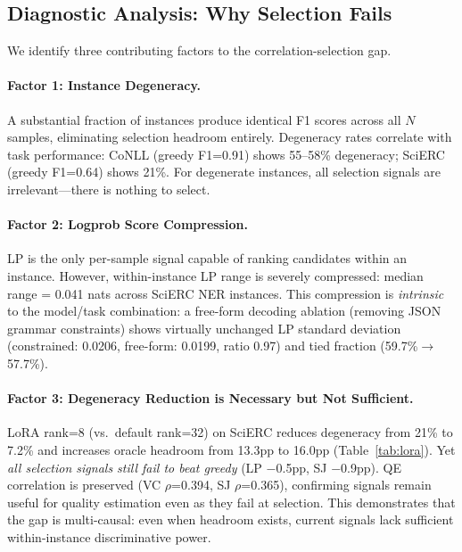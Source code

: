 \documentclass[11pt,a4paper]{article}
\begin{document}
\subsection{Diagnostic Analysis: Why Selection Fails}
\label{sec:diagnostic}

We identify three contributing factors to the correlation-selection gap.

\paragraph{Factor 1: Instance Degeneracy.}
A substantial fraction of instances produce identical F1 scores across all $N$ samples, eliminating selection headroom entirely.
Degeneracy rates correlate with task performance: CoNLL (greedy F1=0.91) shows 55--58\% degeneracy; SciERC (greedy F1=0.64) shows 21\%.
For degenerate instances, all selection signals are irrelevant---there is nothing to select.

\paragraph{Factor 2: Logprob Score Compression.}
LP is the only per-sample signal capable of ranking candidates within an instance.
However, within-instance LP range is severely compressed: median range = 0.041 nats across SciERC NER instances.
This compression is \emph{intrinsic} to the model/task combination: a free-form decoding ablation (removing JSON grammar constraints) shows virtually unchanged LP standard deviation (constrained: 0.0206, free-form: 0.0199, ratio 0.97) and tied fraction (59.7\%$\to$57.7\%).

\paragraph{Factor 3: Degeneracy Reduction is Necessary but Not Sufficient.}
LoRA rank=8 (vs.\ default rank=32) on SciERC reduces degeneracy from 21\% to 7.2\% and increases oracle headroom from 13.3pp to 16.0pp (Table~\ref{tab:lora}).
Yet \emph{all selection signals still fail to beat greedy} (LP $-$0.5pp, SJ $-$0.9pp).
QE correlation is preserved (VC $\rho$=0.394, SJ $\rho$=0.365), confirming signals remain useful for quality estimation even as they fail at selection.
This demonstrates that the gap is multi-causal: even when headroom exists, current signals lack sufficient within-instance discriminative power.
\end{document}
